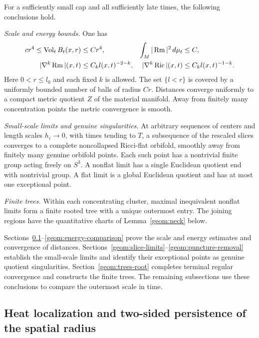 \begin{theorem}\label{thm:degeneration}
For a sufficiently small cap and all sufficiently late times, the
following conclusions hold.

\emph{Scale and energy bounds.} One has
\begin{align}
 cr^4\leq\operatorname{Vol}_t B_t(x,r)&\leq Cr^4,
       &\int_M|\operatorname{Rm}|^2\,d\mu_t&\leq C,\label{geom:volume-energy}\\
 |\nabla^k\operatorname{Rm}|(x,t)&\leq C_k l(x,t)^{-2-k},
       &|\nabla^k\operatorname{Ric}|(x,t)&\leq C_k l(x,t)^{-1-k}.
       \label{eq:ricci-improvement}
\end{align}
Here $0<r\leq l_0$ and each fixed $k$ is allowed. The set
$\{l<r\}$ is covered by a uniformly bounded number of balls of radius
$Cr$. Distances converge uniformly to a compact metric quotient $Z$
of the material manifold. Away from finitely many concentration points
the metric convergence is smooth.

\emph{Small-scale limits and genuine singularities.}
At arbitrary sequences of centers and length scales $h_i\to0$, with
times tending to $T$, a subsequence of the rescaled slices converges
to a complete noncollapsed Ricci-flat orbifold, smoothly away from
finitely many genuine orbifold points. Each such point has a nontrivial
finite group acting freely on $S^3$. A nonflat limit has a single
Euclidean quotient end with nontrivial group. A flat limit is a global
Euclidean quotient and has at most one exceptional point.

\emph{Finite trees.} Within each concentrating cluster, maximal
inequivalent nonflat limits form a finite
rooted tree with a unique outermost entry. The joining regions have the
quantitative charts of Lemma~\ref{geom:neck} below.
\end{theorem}

Sections~\ref{geom:local-estimates}--\ref{geom:energy-comparison}
prove the scale and energy estimates and convergence of distances.
Sections~\ref{geom:slice-limits}--\ref{geom:puncture-removal} establish
the small-scale limits and identify their exceptional points as genuine
quotient singularities. Section~\ref{geom:trees-root} completes terminal
regular convergence and constructs the finite trees. The remaining
subsections use these conclusions to compare the outermost scale in time.

\subsection{Heat localization and two-sided persistence of the spatial radius}
\label{geom:local-estimates}

